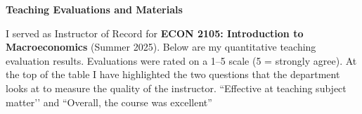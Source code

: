 \documentclass[11pt]{article}
\begin{document}
\thispagestyle{firstpage}

\vspace*{0.6in}
\begin{center}
\Huge \textbf{Teaching Evaluations and Materials}
\end{center}
\vspace*{0.35in}

\noindent I served as Instructor of Record for \textbf{ECON 2105: Introduction to Macroeconomics} (Summer 2025). Below are my quantitative teaching evaluation results. Evaluations were rated on a 1--5 scale (5 = strongly agree). At the top of the table I have highlighted the two questions that the department looks at to measure the quality of the instructor. ``Effective at teaching subject matter’’ and ``Overall, the course was excellent”
\end{document}
